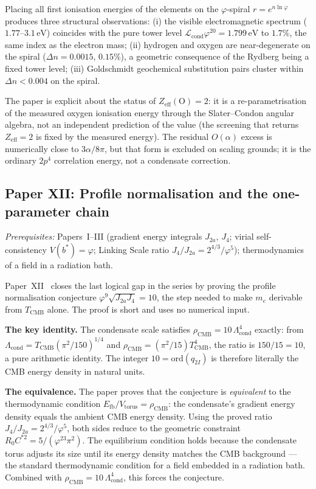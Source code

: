 \documentclass[11pt,a4paper]{article}
\newcommand{\vp}{\varphi}
\newcommand{\TCMB}{T_{\mathrm{CMB}}}
\begin{document}
Placing all first ionisation energies of the elements on the
$\vp$-spiral $r = e^{n\ln\vp}$ produces three structural observations:
(i) the visible electromagnetic spectrum ($1.77$--$3.1\,\mathrm{eV}$)
coincides with the pure tower level $\mathcal{L}_{\mathrm{cond}}\vp^{20}
= 1.799\,\mathrm{eV}$ to $1.7\%$, the same index as the electron mass;
(ii) hydrogen and oxygen are near-degenerate on the spiral
($\Delta n = 0.0015$, $0.15\%$), a geometric consequence of the Rydberg
being a fixed tower level;
(iii) Goldschmidt geochemical substitution pairs cluster within
$\Delta n < 0.004$ on the spiral.

The paper is explicit about the status of $Z_{\mathrm{eff}}(\mathrm{O})=2$:
it is a re-parametrisation of the measured oxygen ionisation energy through
the Slater--Condon angular algebra, not an independent prediction of the
value (the screening that returns $Z_{\mathrm{eff}}=2$ is fixed by the
measured energy). The residual $O(\alpha)$ excess is numerically close to
$3\alpha/8\pi$, but that form is excluded on scaling grounds; it is the
ordinary $2p^4$ correlation energy, not a condensate correction.

\subsection{Paper XII: Profile normalisation and the one-parameter chain}

\textit{Prerequisites:} Papers~I--III (gradient energy integrals $J_{2a}$,
$J_4$; virial self-consistency $V(b^*)=\vp$; Linking Scale ratio
$J_4/J_{2a}=2^{4/3}/\vp^5$); thermodynamics of a field in a radiation bath.

Paper~XII~\cite{Paper12} closes the last logical gap in the series by proving the profile
normalisation conjecture $\vp^9\sqrt{J_{2a}J_4}=10$, the step needed to
make $m_e$ derivable from $\TCMB$ alone.
The proof is short and uses no numerical input.

\textbf{The key identity.}
The condensate scale satisfies $\rho_{\mathrm{CMB}} = 10\,\Lambda_{\mathrm{cond}}^4$
exactly: from $\Lambda_{\mathrm{cond}} = \TCMB(\pi^2/150)^{1/4}$ and
$\rho_{\mathrm{CMB}} = (\pi^2/15)\TCMB^4$, the ratio is $150/15=10$,
a pure arithmetic identity.
The integer $10 = \mathrm{ord}(q_{2I})$ is therefore literally the CMB
energy density in natural units.

\textbf{The equivalence.}
The paper proves that the conjecture is \emph{equivalent} to the thermodynamic
condition $E_{\mathrm{fb}}/V_{\mathrm{torus}} = \rho_{\mathrm{CMB}}$:
the condensate's gradient energy density equals the ambient CMB energy density.
Using the proved ratio $J_4/J_{2a}=2^{4/3}/\vp^5$, both sides reduce to the
geometric constraint $R_0 C^{*2} = 5/(\vp^{23}\pi^2)$.
The equilibrium condition holds because the condensate torus adjusts its size
until its energy density matches the CMB background --- the standard
thermodynamic condition for a field embedded in a radiation bath.
Combined with $\rho_{\mathrm{CMB}}=10\,\Lambda_{\mathrm{cond}}^4$, this forces
the conjecture.
\end{document}
